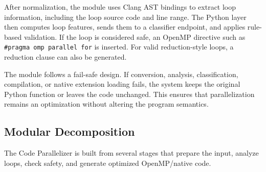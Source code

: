 After normalization, the module uses Clang AST bindings to extract loop
information, including the loop source code and line range. The Python layer then
computes loop features, sends them to a classifier endpoint, and applies rule-based
validation. If the loop is considered safe, an OpenMP directive such as
\texttt{\#pragma omp parallel for} is inserted. For valid reduction-style loops, a
reduction clause can also be generated.

The module follows a fail-safe design. If conversion, analysis, classification,
compilation, or native extension loading fails, the system keeps the original Python
function or leaves the code unchanged. This ensures that parallelization remains an
optimization without altering the program semantics.


\subsection{Modular Decomposition}

The Code Parallelizer is built from several stages that prepare the input,
analyze loops, check safety, and generate optimized OpenMP/native code.

